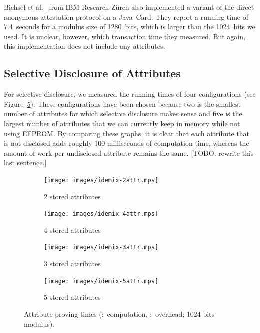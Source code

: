 Bichsel et al.~\cite{BichselCGS2009} from IBM Research Z\"urch also implemented
a variant of the direct anonymous attestation protocol on a Java~Card. They
report a running time of 7.4~seconds for a modulus size of 1280~bits, which is
larger than the 1024~bits we used. It is unclear, however, which transaction
time they measured. But again, this implementation does not include any
attributes.

\subsection{Selective Disclosure of Attributes}

For selective disclosure, we measured the running times of four configurations
(see Figure~\ref{fig:proving}). These configurations have been chosen because
two is the smallest number of attributes for which selective disclosure makes
sense and five is the largest number of attributes that we can currently keep in
memory while not using EEPROM. By comparing these graphs, it is clear that each
attribute that is not disclosed adds roughly 100 milliseconds of computation
time, whereas the amount of work per undisclosed attribute remains the same.
[TODO: rewrite this last sentence.]

\begin{figure}[ht]
  \centering
  \begin{subfigure}[b]{0.45\textwidth}
    \texttt{[image: images/idemix-2attr.mps]}
    \caption{2 stored attributes}
    \label{fig:2attr-sle78}
  \end{subfigure}
  \begin{subfigure}[b]{0.45\textwidth}
    \texttt{[image: images/idemix-4attr.mps]}
    \caption{4 stored attributes}
    \label{fig:4attr-sle78}
  \end{subfigure}

  \begin{subfigure}[b]{0.45\textwidth}
    \texttt{[image: images/idemix-3attr.mps]}
    \caption{3 stored attributes}
    \label{fig:3attr-sle78}
  \end{subfigure}
  \begin{subfigure}[b]{0.45\textwidth}
    \texttt{[image: images/idemix-5attr.mps]}
    \caption{5 stored attributes}
    \label{fig:5attr-sle78}
  \end{subfigure}

  \caption[Attribute proving times.]{
    Attribute proving times
    (:~computation,
      :~overhead; 1024 bits modulus).}
  \label{fig:proving}
\end{figure}

